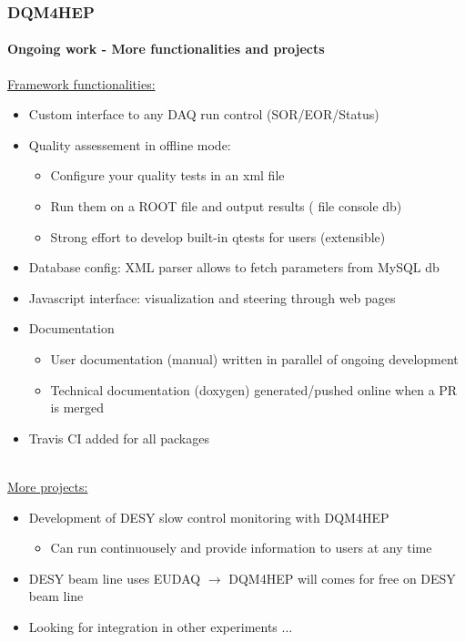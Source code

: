 \documentclass[presentation, 10pt]{beamer}
\begin{document}
\begin{frame}
  \frametitle{DQM4HEP}
  \framesubtitle{Ongoing work - More functionalities and projects}
  \footnotesize
  \underline{Framework functionalities:}
  \begin{itemize}
    \scriptsize
    \item \textcolor{green}{\checkmark} Custom interface to any DAQ run control (SOR/EOR/Status)
    \item Quality assessement in offline mode:
    \begin{itemize}
      \scriptsize
      \item \textcolor{green}{\checkmark} Configure your quality tests in an xml file
      \item \textcolor{green}{\checkmark} Run them on a ROOT file and output results (\textcolor{green}{\checkmark} file \textcolor{green}{\checkmark}console \textcolor{red}{} db)
      \item \textcolor{blue}{} Strong effort to develop built-in qtests for users (extensible)
    \end{itemize}
    \item \textcolor{green}{\checkmark} Database config: XML parser allows to fetch parameters from MySQL db
    \item \textcolor{blue}{} Javascript interface: visualization and steering through web pages   
    \item Documentation
    \begin{itemize}
      \scriptsize
      \item \textcolor{blue}{} User documentation (manual) written in parallel of ongoing development
      \item \textcolor{green}{\checkmark} Technical documentation (doxygen) generated/pushed online when a PR is merged
    \end{itemize}
    \item \textcolor{green}{\checkmark} Travis CI added for all packages
  \end{itemize}
  \pause
  ~\\
  \underline{More projects:}
  \begin{itemize}
    \scriptsize
    \item Development of DESY slow control monitoring with DQM4HEP
    \begin{itemize}
      \scriptsize
      \item Can run continuousely and provide information to users at any time
    \end{itemize}
    \item DESY beam line uses EUDAQ $\rightarrow$ DQM4HEP will comes for free on DESY beam line
    \item Looking for integration in other experiments ...
  \end{itemize}
  \pause
  \centering {}
  
\end{frame}
\end{document}
